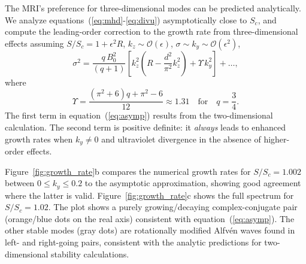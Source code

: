 \documentclass[aps,prl,reprint,superscriptaddress]{revtex4-1}
\newcommand{\SSC}{S/S_{c}}
\begin{document}
The MRI's preference for three-dimensional modes can be predicted analytically.
We analyze equations~(\ref{eq:mhd}-\ref{eq:divu}) asymptotically close to $S_{c}$, and compute the leading-order correction to the growth rate from three-dimensional effects assuming $\SSC=1+\epsilon^{2}R$, $k_{z}\sim\mathcal{O}(\epsilon)$, $\sigma\sim{k_{y}}\sim\mathcal{O}(\epsilon^{2})$, 
\begin{equation}\label{eq:asymp}
\sigma^{2}=\frac{q\,B_{0}^{2}}{(q+1)}\left[ k_{z}^{2}\left(R-\frac{d^2}{\pi^{2}}k_{z}^{2}\right)+\Upsilon\,k_{y}^{2}\right]+\ldots,
\end{equation}
where
\begin{equation}
\Upsilon=\frac{\left(\pi^{2}+6\right) q+\pi^{2}-6}{12}\approx1.31\quad\text{for}\quad{q}=\frac{3}{4}.
\end{equation}
The first term in equation~(\ref{eq:asymp}) results from the two-dimensional calculation.
The second term is positive definite: it \emph{always} leads to enhanced growth rates when $k_{y}\neq0$ and ultraviolet divergence in the absence of higher-order effects.

Figure~\ref{fig:growth_rate}b compares the numerical growth rates for $\SSC=1.002$ between $0\le{k_{y}}\le0.2$ to the asymptotic approximation, showing good agreement where the latter is valid.
Figure~\ref{fig:growth_rate}c shows the full spectrum for $\SSC=1.02$.
The plot shows a purely growing/decaying complex-conjugate pair (orange/blue dots on the real axis) consistent with equation~(\ref{eq:asymp}).
The other stable modes (gray dots) are rotationally modified Alfv\'{e}n waves found in left- and right-going pairs, consistent with the analytic predictions for two-dimensional stability calculations.
\end{document}
